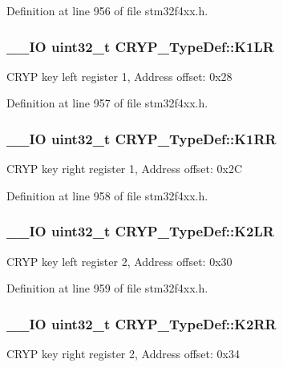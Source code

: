 Definition at line 956 of file stm32f4xx.\-h.

\hypertarget{struct_c_r_y_p___type_def_a816fc42432d8064efbf944430e45050d}{
\subsubsection[{K1\-L\-R}]{\setlength{\rightskip}{0pt plus 5cm}\-\_\-\-\_\-\-I\-O {\bf uint32\-\_\-t} C\-R\-Y\-P\-\_\-\-Type\-Def\-::\-K1\-L\-R}}\label{struct_c_r_y_p___type_def_a816fc42432d8064efbf944430e45050d}
C\-R\-Y\-P key left register 1, Address offset\-: 0x28 

Definition at line 957 of file stm32f4xx.\-h.

\hypertarget{struct_c_r_y_p___type_def_a496e0b1dee706ce76274ae74ee4e8095}{
\subsubsection[{K1\-R\-R}]{\setlength{\rightskip}{0pt plus 5cm}\-\_\-\-\_\-\-I\-O {\bf uint32\-\_\-t} C\-R\-Y\-P\-\_\-\-Type\-Def\-::\-K1\-R\-R}}\label{struct_c_r_y_p___type_def_a496e0b1dee706ce76274ae74ee4e8095}
C\-R\-Y\-P key right register 1, Address offset\-: 0x2\-C 

Definition at line 958 of file stm32f4xx.\-h.

\hypertarget{struct_c_r_y_p___type_def_aa0dc0e8f97e7b7333083c1429c41bca8}{
\subsubsection[{K2\-L\-R}]{\setlength{\rightskip}{0pt plus 5cm}\-\_\-\-\_\-\-I\-O {\bf uint32\-\_\-t} C\-R\-Y\-P\-\_\-\-Type\-Def\-::\-K2\-L\-R}}\label{struct_c_r_y_p___type_def_aa0dc0e8f97e7b7333083c1429c41bca8}
C\-R\-Y\-P key left register 2, Address offset\-: 0x30 

Definition at line 959 of file stm32f4xx.\-h.

\hypertarget{struct_c_r_y_p___type_def_a96ef270d5244bd331fb8db5b0deffb4a}{
\subsubsection[{K2\-R\-R}]{\setlength{\rightskip}{0pt plus 5cm}\-\_\-\-\_\-\-I\-O {\bf uint32\-\_\-t} C\-R\-Y\-P\-\_\-\-Type\-Def\-::\-K2\-R\-R}}\label{struct_c_r_y_p___type_def_a96ef270d5244bd331fb8db5b0deffb4a}
C\-R\-Y\-P key right register 2, Address offset\-: 0x34 

